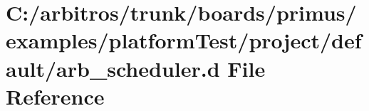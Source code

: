 \hypertarget{boards_2primus_2examples_2platform_test_2project_2default_2arb__scheduler_8d}{\section{C\-:/arbitros/trunk/boards/primus/examples/platform\-Test/project/default/arb\-\_\-scheduler.d File Reference}
\label{boards_2primus_2examples_2platform_test_2project_2default_2arb__scheduler_8d}
}
